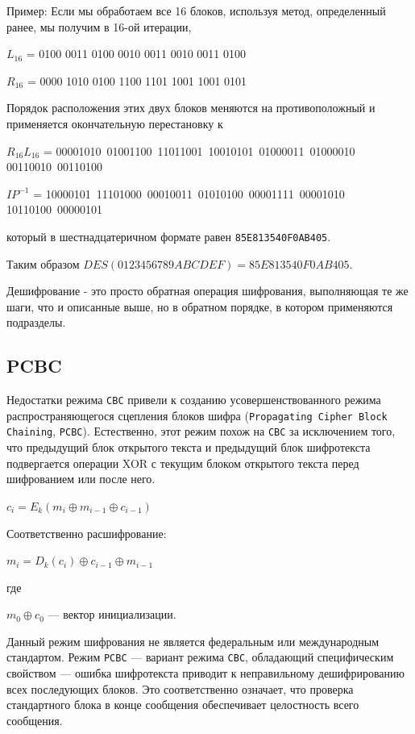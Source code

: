 Пример: Если мы обработаем все 16 блоков, используя метод, определенный ранее, мы получим в 16-ой итерации,

$L_{16}$ = 0100 0011 0100 0010 0011 0010 0011 0100

$R_{16}$ = 0000 1010 0100 1100 1101 1001 1001 0101

Порядок расположения этих двух блоков меняются на противоположный и применяется окончательную перестановку к

$R_{16} L_{16}$ = 00001010\ 01001100\ 11011001\ 10010101\ 01000011\ 01000010\\ 00110010\ 00110100

$IP^{-1}$ = 10000101\ 11101000\ 00010011\ 01010100\ 00001111\ 00001010\\ 10110100\ 00000101

который в шестнадцатеричном формате равен \texttt{85E813540F0AB405}.

Таким образом $DES(0123456789ABCDEF) = 85E813540F0AB405$.

Дешифрование - это просто обратная операция шифрования, выполняющая те же шаги, что и описанные выше, но в обратном порядке, в котором применяются подразделы.

\subsection{PCBC}

Недостатки режима \texttt{CBC} привели к созданию усовершенствованного режима распространяющегося сцепления блоков шифра (\texttt{Propagating Cipher Block Chaining}, \texttt{РСВС}). 
Естественно, этот режим похож на \texttt{CBC} за исключением того, что предыдущий блок открытого текста и предыдущий блок шифротекста подвергается операции XOR с текущим блоком открытого текста перед шифрованием или после него.

$c_{i}=E_{k}\left(m_{{i}}\oplus m_{{i-1}}\oplus c_{{i-1}}\right)$

Соответственно расшифрование:

$m_{i}=D_{k}(c_{{i}})\oplus c_{{i-1}}\oplus m_{{i-1}}$

где 

$m_{{0}}\oplus c_{{0}}$ — вектор инициализации.

Данный режим шифрования не является федеральным или международным стандартом. 
Режим \texttt{РСВС} — вариант режима \texttt{СВС}, обладающий специфическим свойством --- ошибка шифротекста приводит к неправильному дешифрированию всех последующих блоков. 
Это соответственно означает, что проверка стандартного блока в конце сообщения обеспечивает целостность всего сообщения. 

